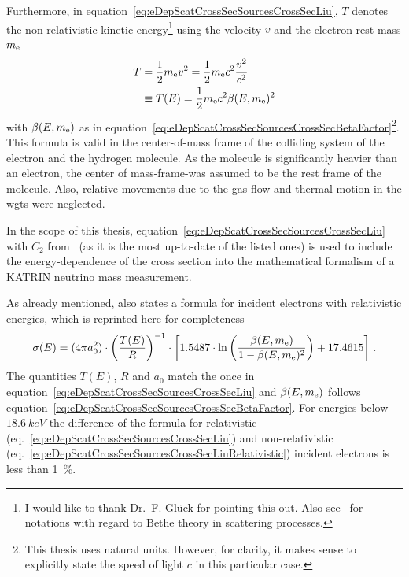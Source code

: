 Furthermore, in equation~\eqref{eq:eDepScatCrossSecSourcesCrossSecLiu}, $T$ denotes the non-relativistic kinetic energy\footnote{I would like to thank Dr.~F. Glück for pointing this out. Also see~\cite{INOKUTI1971} for notations with regard to Bethe theory in scattering processes.} using the velocity $v$ and the electron rest mass $m_{\mathrm{e}}$
\begin{align}
	\label{eq:eDepScatCrossSecSourcesCrossSecNonRelEnergy}
	T  &= \frac{1}{2} m_{\mathrm{e}} v^2 = 
	\frac{1}{2} m_{\mathrm{e}}  c^2  \frac{v^2}{c^2} \nonumber \\
	&\equiv T(E) = \frac{1}{2} m_{\mathrm{e}}  c^2  \beta(E, m_{\mathrm{e}})^2
\end{align}
with $\beta(E, m_{\mathrm{e}})$ as in equation~\eqref{eq:eDepScatCrossSecSourcesCrossSecBetaFactor}\footnote{This thesis uses natural units. However, for clarity, it makes sense to explicitly state the speed of light $c$ in this particular case.}. This formula is valid in the center-of-mass frame of the colliding system of the electron and the hydrogen molecule. As the molecule is significantly heavier than an electron, the center of mass-frame-was assumed to be the rest frame of the molecule. Also, relative movements due to the gas flow and thermal motion in the \gls{wgts} were neglected.

In the scope of this thesis, equation~\eqref{eq:eDepScatCrossSecSourcesCrossSecLiu} with $C_2$ from~\cite{Liu1987} (as it is the most up-to-date of the listed ones) is used to include the energy-dependence of the cross section into the mathematical formalism of a KATRIN neutrino mass measurement.

As already mentioned, \cite{Liu1973} also states a formula for incident electrons with relativistic energies, which is reprinted here for completeness
\begin{equation}
	\label{eq:eDepScatCrossSecSourcesCrossSecLiuRelativistic}
	\sigma(E) =  
	(4 \pi a_0^2) \cdot
	\left(\frac{T(E)}{R}\right)^{-1} \cdot
	\left[
	1.5487 \cdot \ln{\left(\frac{\beta(E,m_{\mathrm{e}})}{1-\beta(E,m_{\mathrm{e}})^2}\right)} + 17.4615
	\right]
	\text{\,.}
\end{equation}
The quantities $T(E)$, $R$ and $a_0$ match the once in equation~\eqref{eq:eDepScatCrossSecSourcesCrossSecLiu} and $\beta(E, m_{\mathrm{e}})$ follows equation~\eqref{eq:eDepScatCrossSecSourcesCrossSecBetaFactor}. For energies below $\SI{18.6}{keV}$ the difference of the formula for relativistic (eq.~\ref{eq:eDepScatCrossSecSourcesCrossSecLiu}) and non-relativistic (eq.~\ref{eq:eDepScatCrossSecSourcesCrossSecLiuRelativistic}) incident electrons is less than \SI{1}{\percent}.

